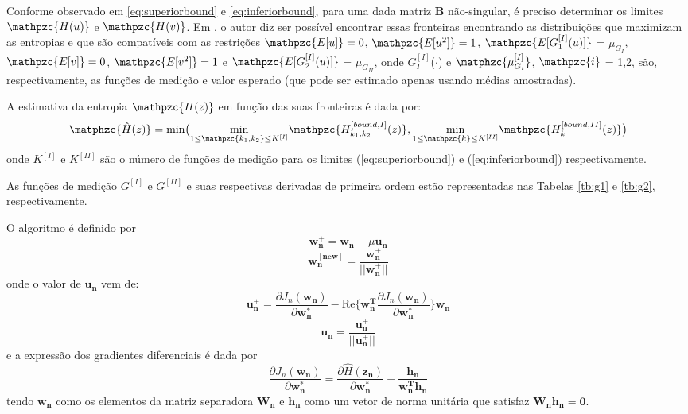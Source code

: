     Conforme observado em \ref{eq:superiorbound} e \ref{eq:inferiorbound}, para uma dada matriz $\mathbf{B}$ não-singular, é preciso determinar os limites $\mathpzc{H(u)}$ e  $\mathpzc{H(v)}$. Em \cite{entropymaximum}, o autor diz ser possível encontrar essas fronteiras encontrando as distribuições que maximizam as entropias e que são compatíveis com as restrições $\mathpzc{E[u]} = 0$, $\mathpzc{E[u^2]} = 1$, $\mathpzc{E[G_1^{[I]}(u)]}$ = $\mu_{G_I}$, $\mathpzc{E[v]} = 0$, $\mathpzc{E[v^2]} = 1$ e $\mathpzc{E[G_2^{[I]}(u)]}$ = $\mu_{G_{II}}$, onde ${G_I^{[I]}}$($\cdot$) e $\matphzc{\mu_{G_i}^{[I]}}$, $\mathpzc{i}$ = 1,2, são, respectivamente, as funções de medição e valor esperado (que pode ser estimado apenas usando médias amostradas).
    
    A estimativa da entropia $\mathpzc{H(z)}$ em função das suas fronteiras é dada por:
    \begin{equation}
        \matphzc{\hat{H}(z)} = \text{min}\big(
        \underset{1\leq\mathpzc{k_1,k_2}\leq K^{[I]}}{\mathrm{min}}\mathpzc{H_{k_1,k_2}^{[bound,I]}(z)}
        ,
        \underset{1 \leq \mathpzc{k}\leq K^{[II]}}{\mathrm{min}}\mathpzc{H_k^{[bound,II]}(z)}
        \big)
    \end{equation}
    \bigskip
    onde ${K^{[I]}}$ e ${K^{[II]}}$ são o número de funções de medição para os limites (\ref{eq:superiorbound}) e (\ref{eq:inferiorbound}) respectivamente.
    
    As funções de medição ${G^{[I]}}$ e ${G^{[II]}}$ e suas respectivas derivadas de primeira ordem estão representadas nas Tabelas \ref{tb:g1} e \ref{tb:g2}, respectivamente. 

    O algoritmo é definido por
    \begin{equation}
        \mathbf{w_n^+} = \mathbf{w_n} - \mu\mathbf{u_n}
    \end{equation}
    \begin{equation}
        \mathbf{w_n^{[new]}} = \frac{\mathbf{w_n^+}}{||\mathbf{w_n^+}||}
    \end{equation}
    onde o valor de $\mathbf{u_n}$ vem de:
    \begin{equation}
        \mathbf{u_n^+} = \frac{\partial J_n(\mathbf{w_n})}{\partial \mathbf{w_n^*}} - \text{Re}\{\mathbf{w_n^T}\frac{\partial J_n(\mathbf{w_n})}{\partial \mathbf{w_n^*}}\}\mathbf{w_n}
    \end{equation}
    \begin{equation}
        \mathbf{u_n} = \frac{\mathbf{u_n^+}}{||\mathbf{u_n^+}||}
    \end{equation}
    e a expressão dos gradientes diferenciais é dada por
    \begin{equation}
        \frac{\partial J_n(\mathbf{w_n})}{\partial \mathbf{w_n^*}} = \frac{\partial \hat{H}(\mathbf{z_n})}{\partial \mathbf{w_n^*}} - \frac{\mathbf{h_n}}{\mathbf{w_n^Th_n}}
    \end{equation}
    tendo  $\mathbf{w_n}$ como os elementos da matriz separadora $\mathbf{W_n}$  e $\mathbf{h_n}$ como um vetor de norma unitária que satisfaz $\mathbf{W_nh_n = 0}$.
    
